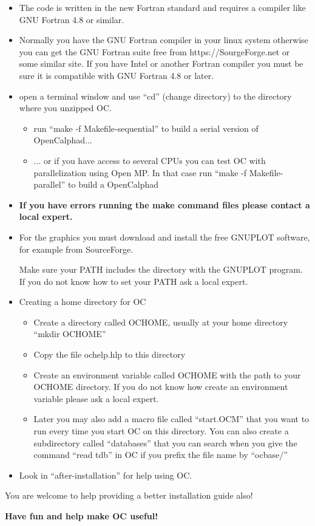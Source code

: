 \documentclass[12pt]{article}
\begin{document}
\begin{itemize}
\item The code is written in the new Fortran standard and requires a
  compiler like GNU Fortran 4.8 or similar.

\item Normally you have the GNU Fortran compiler in your linux system
  otherwise you can get the GNU Fortran suite free from
  https://SourgeForge.net or some similar site.  If you have Intel or
  another Fortran compiler you must be sure it is compatible with GNU
  Fortran 4.8 or later.

\item open a terminal window and use ``cd'' (change directory) to the
  directory where you unzipped OC.

  \begin{itemize}
  \item run ``make -f Makefile-sequential'' to build a serial version of OpenCalphad...

  \item ... or if you have access to several CPUs you can test OC with
    parallelization using Open MP.  In that case run ``make -f Makefile-parallel'' to build a OpenCalphad
  \end{itemize}

\item {\bf If you have errors running the make command files please
    contact a local expert.}

\item For the graphics you must download and install the free GNUPLOT
  software, for example from SourceForge.

  Make sure your PATH includes the directory with the GNUPLOT program.
  If you do not know how to set your PATH ask a local expert.

\item Creating a home directory for OC

  \begin{itemize}
  \item Create a directory called OCHOME, usually at your home
    directory ``mkdir OCHOME''

  \item Copy the file ochelp.hlp to this directory

  \item Create an environment variable called OCHOME with the path
    to your OCHOME directory.  If you do not know how create an
    environment variable please ask a local expert.

  \item Later you may also add a macro file called ``start.OCM''
    that you want to run every time you start OC on this directory.
    You can also create a subdirectory called ``databases'' that you
    can search when you give the command ``read tdb'' in OC if you
    prefix the file name by ``ocbase/''
  \end{itemize}

\item Look in ``after-installation'' for help using OC.

\end{itemize}

You are welcome to help providing a better installation guide also!

\bigskip

{\large \bf Have fun and help make OC useful!}
\end{document}
